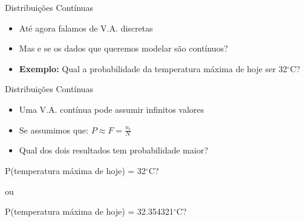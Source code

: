 \documentclass{beamer}\usepackage[]{graphicx}\usepackage[]{color}
\begin{document}
\begin{frame}{Distribuições Contínuas}

\begin{itemize}
  \item Até agora falamos de V.A. discretas
  \item Mas e se os dados que queremos modelar são contínuos?
  \item \textbf{Exemplo:} Qual a probabilidade da temperatura máxima de hoje ser 32$^\circ$C?
\end{itemize}

\end{frame} 

\begin{frame}{Distribuições Contínuas}

\begin{itemize}
  \item Uma V.A. contínua pode assumir infinitos valores
  
  \vfill
  
  \item Se assumimos que: $P \approx F = \frac{n_i}{N}$
  
  \vfill
  
  \item Qual dos dois resultados tem probabilidade maior?
  
  \end{itemize}

\centering
  P(temperatura máxima de hoje) =  32$^\circ$C?
  
  ou
  
  P(temperatura máxima de hoje) = 32.354321$^\circ$C?
  
\end{frame} 


\end{document}

